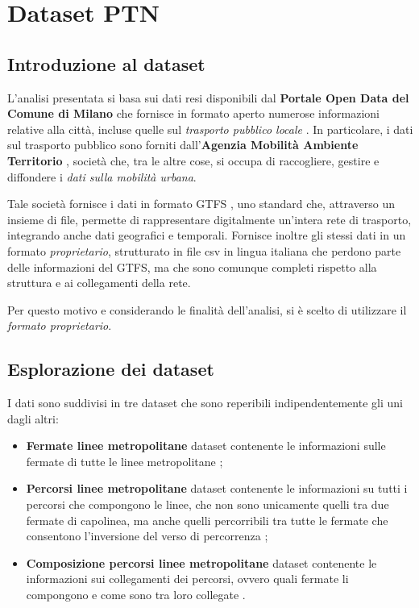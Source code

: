 \chapter{Dataset PTN}
\label{cap1}

\section{Introduzione al dataset}
L'analisi presentata si basa sui dati resi disponibili dal \textbf{Portale Open Data del Comune di Milano} che fornisce in formato aperto numerose informazioni relative alla città, incluse quelle sul \textit{trasporto pubblico locale} \cite{ComuneMilanoOpenData}. In particolare, i dati sul trasporto pubblico sono forniti dall'\textbf{Agenzia Mobilità Ambiente Territorio} \cite{Amat}, società che, tra le altre cose, si occupa di raccogliere, gestire e diffondere i \textit{dati sulla mobilità urbana}.

Tale società fornisce i dati in formato GTFS \cite{GTFS}, uno standard che, attraverso un insieme di file, permette di rappresentare digitalmente un'intera rete di trasporto, integrando anche dati geografici e temporali. Fornisce inoltre gli stessi dati in un formato \textit{proprietario}, strutturato in file csv in lingua italiana che perdono parte delle informazioni del GTFS, ma che sono comunque completi rispetto alla struttura e ai collegamenti della rete.

Per questo motivo e considerando le finalità dell'analisi, si è scelto di utilizzare il \textit{formato proprietario}.

\section{Esplorazione dei dataset}
I dati sono suddivisi in tre dataset che sono reperibili indipendentemente gli uni dagli altri:
\begin{itemize}
    \item \textbf{Fermate linee metropolitane} dataset contenente le informazioni sulle fermate di tutte le linee metropolitane \cite{FermateLineeMetropolitane};
    \item \textbf{Percorsi linee metropolitane} dataset contenente le informazioni su tutti i percorsi che compongono le linee, che non sono unicamente quelli tra due fermate di capolinea, ma anche quelli percorribili tra tutte le fermate che consentono l'inversione del verso di percorrenza \cite{PercorsiLineeMetropolitane};
    \item \textbf{Composizione percorsi linee metropolitane} dataset contenente le informazioni sui collegamenti dei percorsi, ovvero quali fermate li compongono e come sono tra loro collegate \cite{ComposizionePercorsiLineeMetropolitane}.
\end{itemize}

